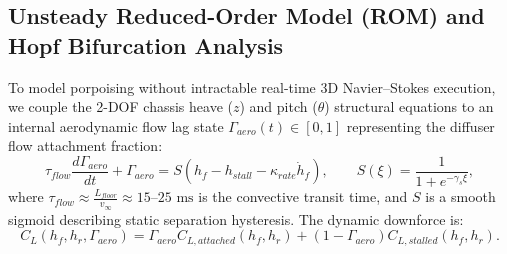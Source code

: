 \documentclass[11pt,a4paper,reqno]{article}
\def\mathrm#1{#1}%
\def\mathcal#1{#1}%
\theoremstyle{plain}
\theoremstyle{definition}
\theoremstyle{remark}
\numberwithin{equation}{section}
\begin{document}
\subsection{Unsteady Reduced-Order Model (ROM) and Hopf Bifurcation Analysis}
To model porpoising without intractable real-time 3D Navier--Stokes execution, we couple the 2-DOF chassis heave ($z$) and pitch ($\theta$) structural equations to an internal aerodynamic flow lag state $\Gamma_{\mathrm{aero}}(t) \in [0, 1]$ representing the diffuser flow attachment fraction:
\begin{equation}
  \tau_{\mathrm{flow}}\frac{d\Gamma_{\mathrm{aero}}}{dt} + \Gamma_{\mathrm{aero}} = \mathcal{S}\!\left(h_f - h_{\mathrm{stall}} - \kappa_{\mathrm{rate}}\dot{h}_f\right), \qquad \mathcal{S}(\xi) = \frac{1}{1 + e^{-\gamma_s \xi}},
  \label{eq:aero_flow_lag}
\end{equation}
where $\tau_{\mathrm{flow}} \approx \frac{L_{\mathrm{floor}}}{v_\infty} \approx 15\text{--}25\text{ ms}$ is the convective transit time, and $\mathcal{S}$ is a smooth sigmoid describing static separation hysteresis. The dynamic downforce is:
\begin{equation}
  C_L(h_f, h_r, \Gamma_{\mathrm{aero}}) = \Gamma_{\mathrm{aero}} C_{L,\mathrm{attached}}(h_f, h_r) + (1 - \Gamma_{\mathrm{aero}}) C_{L,\mathrm{stalled}}(h_f, h_r).
  \label{eq:dynamic_cl}
\end{equation}
\end{document}
